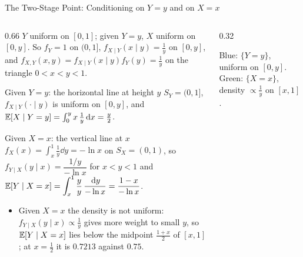 \begin{frame}{The Two-Stage Point: Conditioning on $Y=y$ and on $X=x$}
  \small
  \begin{columns}[T]
    \begin{column}{0.66\textwidth}
      $Y$ uniform on $[0,1]$; given $Y=y$, $X$ uniform on $[0,y]$. So $f_Y=1$ on $(0,1]$, $f_{X\mid Y}(x\mid y)=\tfrac1y$ on $[0,y]$, and $f_{X,Y}(x,y)=f_{X\mid Y}(x\mid y)f_Y(y)=\tfrac1y$ on the triangle $0<x<y<1$.
      \begin{exampleblock}{Given $Y=y$: the horizontal line at height $y$}
        $S_Y=(0,1]$, $f_{X\mid Y}(\cdot\mid y)$ is uniform on $[0,y]$, and
        $\mathbb{E}[X\mid Y=y]=\int_0^y x\,\tfrac1y\,\mathrm{d} x=\tfrac y2$.
      \end{exampleblock}
      \begin{exampleblock}{Given $X=x$: the vertical line at $x$}
        $f_X(x)=\int_x^1\tfrac1y\dd y=-\ln x$ on $S_X=(0,1)$, so $f_{Y\mid X}(y\mid x)=\dfrac{1/y}{-\ln x}$ for $x<y<1$ and
        $\mathbb{E}[Y\mid X=x]=\displaystyle\int_x^1\frac{y}{y}\,\frac{\,\mathrm{d} y}{-\ln x}=\frac{1-x}{-\ln x}$.
      \end{exampleblock}
      \begin{itemize}
        \item Given $X=x$ the density is not uniform: $f_{Y\mid X}(y\mid x)\propto\tfrac1y$ gives more weight to small $y$, so $\mathbb{E}[Y\mid X=x]$ lies below the midpoint $\tfrac{1+x}2$ of $[x,1]$; at $x=\tfrac12$ it is $0.7213$ against $0.75$.
      \end{itemize}
    \end{column}
    \begin{column}{0.32\textwidth}
      \centering
      \par\medskip
      {\footnotesize Blue: $\{Y=y\}$, uniform on $[0,y]$. Green: $\{X=x\}$, density $\propto\tfrac1y$ on $[x,1]$.}
    \end{column}
  \end{columns}
\end{frame}

